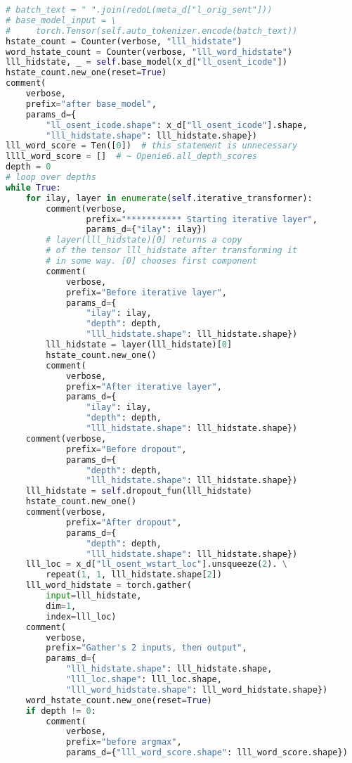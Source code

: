 \documentclass[12pt]{article}
\begin{document}
\begin{lstlisting}[language=Python]
# batch_text = " ".join(redoL(meta_d["l_orig_sent"]))
# base_model_input = \
#     torch.Tensor(self.auto_tokenizer.encode(batch_text))
hstate_count = Counter(verbose, "lll_hidstate")
word_hstate_count = Counter(verbose, "lll_word_hidstate")
lll_hidstate, _ = self.base_model(x_d["ll_osent_icode"])
hstate_count.new_one(reset=True)
comment(
    verbose,
    prefix="after base_model",
    params_d={
        "ll_osent_icode.shape": x_d["ll_osent_icode"].shape,
        "lll_hidstate.shape": lll_hidstate.shape})
lll_word_score = Ten([0])  # this statement is unnecessary
llll_word_score = []  # ~ Openie6.all_depth_scores
depth = 0
# loop over depths
while True:
    for ilay, layer in enumerate(self.iterative_transformer):
        comment(verbose,
                prefix="*********** Starting iterative layer",
                params_d={"ilay": ilay})
        # layer(lll_hidstate)[0] returns a copy
        # of the tensor lll_hidstate after transforming it
        # in some way. [0] chooses first component
        comment(
            verbose,
            prefix="Before iterative layer",
            params_d={
                "ilay": ilay,
                "depth": depth,
                "lll_hidstate.shape": lll_hidstate.shape})
        lll_hidstate = layer(lll_hidstate)[0]
        hstate_count.new_one()
        comment(
            verbose,
            prefix="After iterative layer",
            params_d={
                "ilay": ilay,
                "depth": depth,
                "lll_hidstate.shape": lll_hidstate.shape})
    comment(verbose,
            prefix="Before dropout",
            params_d={
                "depth": depth,
                "lll_hidstate.shape": lll_hidstate.shape})
    lll_hidstate = self.dropout_fun(lll_hidstate)
    hstate_count.new_one()
    comment(verbose,
            prefix="After dropout",
            params_d={
                "depth": depth,
                "lll_hidstate.shape": lll_hidstate.shape})
    lll_loc = x_d["ll_osent_wstart_loc"].unsqueeze(2). \
        repeat(1, 1, lll_hidstate.shape[2])
    lll_word_hidstate = torch.gather(
        input=lll_hidstate,
        dim=1,
        index=lll_loc)
    comment(
        verbose,
        prefix="Gather's 2 inputs, then output",
        params_d={
            "lll_hidstate.shape": lll_hidstate.shape,
            "lll_loc.shape": lll_loc.shape,
            "lll_word_hidstate.shape": lll_word_hidstate.shape})
    word_hstate_count.new_one(reset=True)
    if depth != 0:
        comment(
            verbose,
            prefix="before argmax",
            params_d={"lll_word_score.shape": lll_word_score.shape})

\end{lstlisting}
\end{document}
